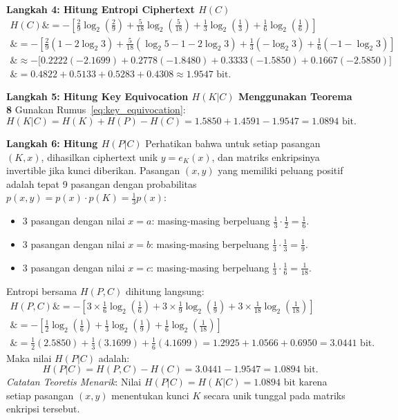 \documentclass[11pt,a4paper]{article}
\begin{document}
\noindent\textbf{Langkah 4: Hitung Entropi Ciphertext $H(C)$}
\begin{align*}
H(C) \&= - \left[ \frac{2}{9}\log_2\left(\frac{2}{9}\right) + \frac{5}{18}\log_2\left(\frac{5}{18}\right) + \frac{1}{3}\log_2\left(\frac{1}{3}\right) + \frac{1}{6}\log_2\left(\frac{1}{6}\right) \right] \\
\&= - \left[ \frac{2}{9}(1 - 2\log_2 3) + \frac{5}{18}(\log_2 5 - 1 - 2\log_2 3) + \frac{1}{3}(-\log_2 3) + \frac{1}{6}(-1 - \log_2 3) \right] \\
\&\approx - \Big[ 0.2222(-2.1699) + 0.2778(-1.8480) + 0.3333(-1.5850) + 0.1667(-2.5850) \Big] \\
\&= 0.4822 + 0.5133 + 0.5283 + 0.4308 \approx 1.9547 \text{ bit}.
\end{align*}

\noindent\textbf{Langkah 5: Hitung Key Equivocation $H(K|C)$ Menggunakan Teorema 8}
Gunakan Rumus~\eqref{eq:key_equivocation}:
\[
H(K|C) = H(K) + H(P) - H(C) = 1.5850 + 1.4591 - 1.9547 = 1.0894 \text{ bit}.
\]

\noindent\textbf{Langkah 6: Hitung $H(P|C)$}
Perhatikan bahwa untuk setiap pasangan $(K, x)$, dihasilkan ciphertext unik $y = e_K(x)$, dan matriks enkripsinya invertible jika kunci diberikan. Pasangan $(x, y)$ yang memiliki peluang positif adalah tepat 9 pasangan dengan probabilitas $p(x, y) = p(x) \cdot p(K) = \frac{1}{3}p(x)$:
\begin{itemize}
    \item 3 pasangan dengan nilai $x=a$: masing-masing berpeluang $\frac{1}{3} \cdot \frac{1}{2} = \frac{1}{6}$.
    \item 3 pasangan dengan nilai $x=b$: masing-masing berpeluang $\frac{1}{3} \cdot \frac{1}{3} = \frac{1}{9}$.
    \item 3 pasangan dengan nilai $x=c$: masing-masing berpeluang $\frac{1}{3} \cdot \frac{1}{6} = \frac{1}{18}$.
\end{itemize}
Entropi bersama $H(P, C)$ dihitung langsung:
\begin{align*}
H(P, C) \&= - \left[ 3 \times \frac{1}{6}\log_2\left(\frac{1}{6}\right) + 3 \times \frac{1}{9}\log_2\left(\frac{1}{9}\right) + 3 \times \frac{1}{18}\log_2\left(\frac{1}{18}\right) \right] \\
\&= - \left[ \frac{1}{2}\log_2\left(\frac{1}{6}\right) + \frac{1}{3}\log_2\left(\frac{1}{9}\right) + \frac{1}{6}\log_2\left(\frac{1}{18}\right) \right] \\
\&= \frac{1}{2}(2.5850) + \frac{1}{3}(3.1699) + \frac{1}{6}(4.1699) = 1.2925 + 1.0566 + 0.6950 = 3.0441 \text{ bit}.
\end{align*}
Maka nilai $H(P|C)$ adalah:
\[
H(P|C) = H(P, C) - H(C) = 3.0441 - 1.9547 = 1.0894 \text{ bit}.
\]
\textit{Catatan Teoretis Menarik}: Nilai $H(P|C) = H(K|C) = 1.0894$ bit karena setiap pasangan $(x, y)$ menentukan kunci $K$ secara unik tunggal pada matriks enkripsi tersebut.
\end{document}
